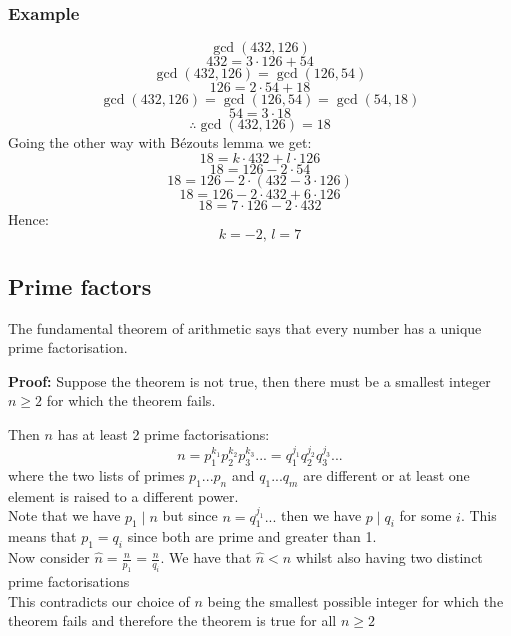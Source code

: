 \documentclass[12pt]{article}
\begin{document}
\subsubsection*{Example}
\[\gcd(432,126)\]
\begin{equation}
    432=3\cdot126+54
\end{equation}
\[\gcd(432,126)=\gcd(126,54)\]
\begin{equation}
    126=2\cdot54+18
\end{equation}
\[\gcd(432,126)=\gcd(126,54)=\gcd(54,18)\]
\begin{equation}
    54=3\cdot18
\end{equation}
\[\therefore \gcd(432,126)=18\]
Going the other way with B\'ezouts lemma we get:
\[18=k\cdot432+l\cdot126\]
\[18=126-2\cdot54\]
\[18=126-2\cdot(432-3\cdot126)\]
\[18=126-2\cdot432+6\cdot126\]
\[18=7\cdot126-2\cdot432\]
Hence:
\[k=-2,\,l=7\]
\subsection*{Prime factors}
The fundamental theorem of arithmetic says that every number has a unique prime factorisation.

\textbf{Proof:}
Suppose the theorem is not true, then there must be a smallest integer \(n\geq 2\) for which the theorem fails.

Then \(n\) has at least 2 prime factorisations:
\[n = p_1^{k_1}p_2^{k_2}p_3^{k_3}... = q_1^{j_1}q_2^{j_2}q_3^{j_3}...\]
where the two lists of primes \(p_1 ... p_n\) and \(q_1 ... q_m\) are different or at least one element is raised to a different power. 
\\
Note that we have \(p_1 \mid n\) but since \(n = q_1^{j_1}...\) then we have \(p\mid q_i\) for some \(i\). This means that \(p_1=q_i\) since both are prime and greater than 1.
\\
Now consider 
\(\hat{n}=\frac{n}{p_1}=\frac{n}{q_i}\). We have that \(\hat{n}<n\) whilst also having two distinct prime factorisations
\\
This contradicts our choice of \(n\) being the smallest possible integer for which the theorem fails and therefore the theorem is true for all \(n\geq 2\)
\end{document}
